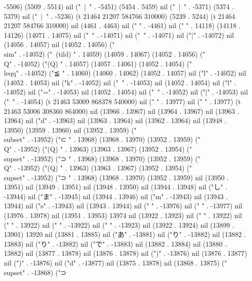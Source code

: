 -5506) (5509 . 5514) nil ("~|~" . -5451) (5454 . 5459) nil ("~|~" . -5371) (5374 . 5379) nil ("~|~" . -5236) (t 21464 21207 584766 310000) (5239 . 5244) (t 21464 21207 584766 310000) nil (4461 . 4463) nil ("
" . -4461) nil ("%
" . 14118) (14118 . 14126) (14071 . 14075) nil ("~" . -14071) nil ("~" . -14071) nil ("|" . -14072) nil (14056 . 14057) nil (14052 . 14056) ("\\sim" . -14052) ("~(tild)
" . 14059) (14059 . 14067) (14052 . 14056) ("\\Q" . -14052) ("(Q)
" . 14057) (14057 . 14061) (14052 . 14054) ("\\leqq" . -14052) ("≦
" . 14060) (14060 . 14062) (14052 . 14057) nil ("l" . -14052) nil (14052 . 14053) nil ("k" . -14052) nil ("~" . -14053) nil (14052 . 14054) nil ("l" . -14052) nil ("=" . -14053) nil (14052 . 14054) nil ("~" . -14052) nil ("|" . -14053) nil ("~" . -14054) (t 21463 53009 868378 540000) nil (" " . 13977) nil ("
" . 13977) (t 21463 53006 308360 864000) nil (13966 . 13967) nil (13964 . 13967) nil (13963 . 13964) nil ("d" . -13963) nil (13963 . 13964) nil (13962 . 13964) nil (13948 . 13950) (13959 . 13960) nil (13952 . 13959) ("\\subset" . -13952) ("⊂
" . 13968) (13968 . 13970) (13952 . 13959) ("\\Q" . -13952) ("(Q)
" . 13963) (13963 . 13967) (13952 . 13954) ("\\supset" . -13952) ("⊃
" . 13968) (13968 . 13970) (13952 . 13959) ("\\Q" . -13952) ("(Q)
" . 13963) (13963 . 13967) (13952 . 13954) ("\\supset" . -13952) ("⊃
" . 13968) (13968 . 13970) (13952 . 13959) nil (13950 . 13951) nil (13949 . 13951) nil (13948 . 13950) nil (13944 . 13948) nil ("し" . -13944) nil ("ま" . -13945) nil (13944 . 13946) nil ("m" . -13943) nil (13943 . 13944) nil ("s" . -13943) nil (13943 . 13944) nil ("
" . -13976) nil (" " . -13977) nil (13976 . 13978) nil (13951 . 13953) 13974 nil (13922 . 13923) nil (" " . 13922) nil ("
" . 13922) nil ("
" . -13922) nil (" " . -13923) nil (13922 . 13924) nil (13899 . 13901) 13920 nil (13881 . 13885) nil ("あ" . -13881) nil ("り" . -13882) nil (13882 . 13883) nil ("り" . -13882) nil ("で" . -13883) nil (13882 . 13884) nil (13880 . 13882) nil (13877 . 13878) nil (13876 . 13878) nil (")" . -13876) nil (13876 . 13877) nil (")" . -13876) nil ("d" . -13877) nil (13875 . 13878) nil (13868 . 13875) ("\\supset" . -13868) ("⊃
